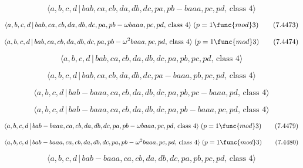 \documentclass[10pt]{article}
\begin{document}
\begin{equation}
\langle a,b,c,d\,|\,bab,ca,cb,da,db,dc,pa,pb-baaa,pc,pd,\,\text{class }%
4\rangle  \tag{7.4472}
\end{equation}

\begin{equation}
\langle a,b,c,d\,|\,bab,ca,cb,da,db,dc,pa,pb-\omega baaa,pc,pd,\,\text{class 
}4\rangle \;(p=1\func{mod}3)  \tag{7.4473}
\end{equation}

\begin{equation}
\langle a,b,c,d\,|\,bab,ca,cb,da,db,dc,pa,pb-\omega ^{2}baaa,pc,pd,\,\text{%
class }4\rangle \;(p=1\func{mod}3)  \tag{7.4474}
\end{equation}

\begin{equation}
\langle a,b,c,d\,|\,bab,ca,cb,da,db,dc,pa,pb,pc,pd,\,\text{class }4\rangle 
\tag{7.4475}
\end{equation}

\begin{equation}
\langle a,b,c,d\,|\,bab,ca,cb,da,db,dc,pa-baaa,pb,pc,pd,\,\text{class }%
4\rangle  \tag{7.4476}
\end{equation}

\begin{equation}
\langle a,b,c,d\,|\,bab-baaa,ca,cb,da,db,dc,pa,pb,pc-baaa,pd,\,\text{class }%
4\rangle  \tag{7.4477}
\end{equation}

\begin{equation}
\langle a,b,c,d\,|\,bab-baaa,ca,cb,da,db,dc,pa,pb-baaa,pc,pd,\,\text{class }%
4\rangle  \tag{7.4478}
\end{equation}

\begin{equation}
\langle a,b,c,d\,|\,bab-baaa,ca,cb,da,db,dc,pa,pb-\omega baaa,pc,pd,\,\text{%
class }4\rangle \;(p=1\func{mod}3)  \tag{7.4479}
\end{equation}

\begin{equation}
\langle a,b,c,d\,|\,bab-baaa,ca,cb,da,db,dc,pa,pb-\omega ^{2}baaa,pc,pd,\,%
\text{class }4\rangle \;(p=1\func{mod}3)  \tag{7.4480}
\end{equation}

\begin{equation}
\langle a,b,c,d\,|\,bab-baaa,ca,cb,da,db,dc,pa,pb,pc,pd,\,\text{class }%
4\rangle  \tag{7.4481}
\end{equation}
\end{document}

